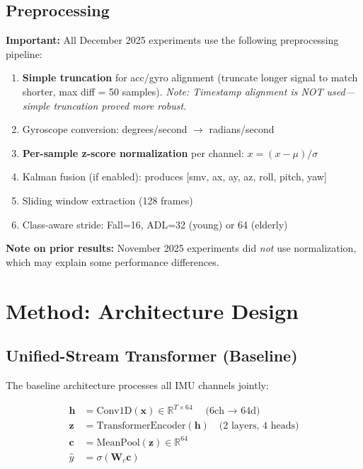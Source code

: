 \documentclass{article}
\begin{document}
\subsection{Preprocessing}
\label{sec:preprocessing}

\textbf{Important:} All December 2025 experiments use the following preprocessing pipeline:

\begin{enumerate}
    \item \textbf{Simple truncation} for acc/gyro alignment (truncate longer signal to match shorter, max diff = 50 samples). \textit{Note: Timestamp alignment is NOT used---simple truncation proved more robust.}
    \item Gyroscope conversion: degrees/second $\rightarrow$ radians/second
    \item \textbf{Per-sample z-score normalization} per channel: $x = (x - \mu) / \sigma$
    \item Kalman fusion (if enabled): produces [smv, ax, ay, az, roll, pitch, yaw]
    \item Sliding window extraction (128 frames)
    \item Class-aware stride: Fall=16, ADL=32 (young) or 64 (elderly)
\end{enumerate}

\textbf{Note on prior results:} November 2025 experiments did \textit{not} use normalization, which may explain some performance differences.

\section{Method: Architecture Design}

\subsection{Unified-Stream Transformer (Baseline)}

The baseline architecture processes all IMU channels jointly:

\begin{align}
    \mathbf{h} &= \text{Conv1D}(\mathbf{x}) \in \mathbb{R}^{T \times 64} \quad \text{(6ch $\rightarrow$ 64d)} \\
    \mathbf{z} &= \text{TransformerEncoder}(\mathbf{h}) \quad \text{(2 layers, 4 heads)} \\
    \mathbf{c} &= \text{MeanPool}(\mathbf{z}) \in \mathbb{R}^{64} \\
    \hat{y} &= \sigma(\mathbf{W}_c \mathbf{c})
\end{align}
\end{document}
